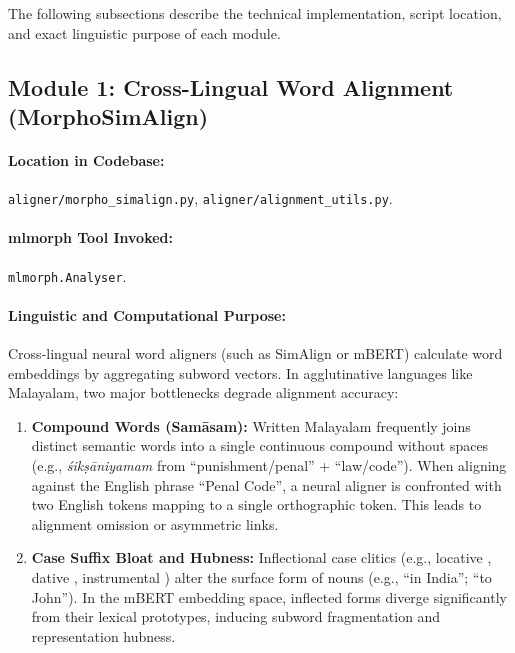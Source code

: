 The following subsections describe the technical implementation, script location, and exact linguistic purpose of each module.

\subsection{Module 1: Cross-Lingual Word Alignment (MorphoSimAlign)}
\label{subsec:mod1_alignment}

\paragraph{Location in Codebase:} \texttt{aligner/morpho\_simalign.py}, \texttt{aligner/alignment\_utils.py}.
\paragraph{mlmorph Tool Invoked:} \texttt{mlmorph.Analyser}.

\paragraph{Linguistic and Computational Purpose:}
Cross-lingual neural word aligners (such as SimAlign or mBERT) calculate word embeddings by aggregating subword vectors. In agglutinative languages like Malayalam, two major bottlenecks degrade alignment accuracy:
\begin{enumerate}
    \item \textbf{Compound Words (Samāsam):} Written Malayalam frequently joins distinct semantic words into a single continuous compound without spaces (e.g.,  \textit{śikṣāniyamam} from  ``punishment/penal'' +  ``law/code''). When aligning against the English phrase ``Penal Code'', a neural aligner is confronted with two English tokens mapping to a single orthographic token. This leads to alignment omission or asymmetric links.
    \item \textbf{Case Suffix Bloat and Hubness:} Inflectional case clitics (e.g., locative , dative , instrumental ) alter the surface form of nouns (e.g.,  ``in India'';  ``to John''). In the mBERT embedding space, inflected forms diverge significantly from their lexical prototypes, inducing subword fragmentation and representation hubness.
\end{enumerate}

